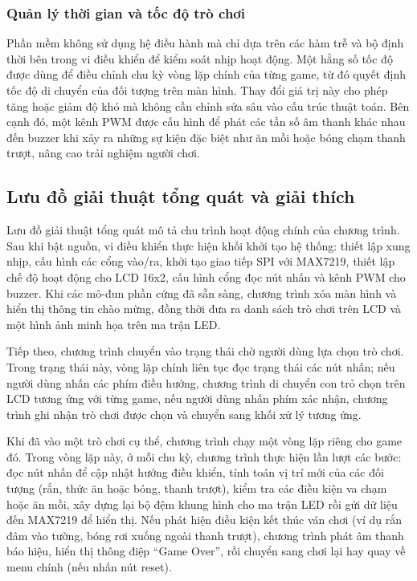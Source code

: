 \subsubsection{Quản lý thời gian và tốc độ trò chơi}
Phần mềm không sử dụng hệ điều hành mà chỉ dựa trên các hàm trễ và bộ định thời bên trong vi điều khiển để kiểm soát nhịp hoạt động. Một hằng số tốc độ được dùng để điều chỉnh chu kỳ vòng lặp chính của từng game, từ đó quyết định tốc độ di chuyển của đối tượng trên màn hình. Thay đổi giá trị này cho phép tăng hoặc giảm độ khó mà không cần chỉnh sửa sâu vào cấu trúc thuật toán. Bên cạnh đó, một kênh PWM được cấu hình để phát các tần số âm thanh khác nhau đến buzzer khi xảy ra những sự kiện đặc biệt như ăn mồi hoặc bóng chạm thanh trượt, nâng cao trải nghiệm người chơi.
\subsection{Lưu đồ giải thuật tổng quát và giải thích}
Lưu đồ giải thuật tổng quát mô tả chu trình hoạt động chính của chương trình. Sau khi bật nguồn, vi điều khiển thực hiện khối khởi tạo hệ thống: thiết lập xung nhịp, cấu hình các cổng vào/ra, khởi tạo giao tiếp SPI với MAX7219, thiết lập chế độ hoạt động cho LCD 16x2, cấu hình cổng đọc nút nhấn và kênh PWM cho buzzer. Khi các mô-đun phần cứng đã sẵn sàng, chương trình xóa màn hình và hiển thị thông tin chào mừng, đồng thời đưa ra danh sách trò chơi trên LCD và một hình ảnh minh họa trên ma trận LED.

Tiếp theo, chương trình chuyển vào trạng thái chờ người dùng lựa chọn trò chơi. Trong trạng thái này, vòng lặp chính liên tục đọc trạng thái các nút nhấn; nếu người dùng nhấn các phím điều hướng, chương trình di chuyển con trỏ chọn trên LCD tương ứng với từng game, nếu người dùng nhấn phím xác nhận, chương trình ghi nhận trò chơi được chọn và chuyển sang khối xử lý tương ứng.

Khi đã vào một trò chơi cụ thể, chương trình chạy một vòng lặp riêng cho game đó. Trong vòng lặp này, ở mỗi chu kỳ, chương trình thực hiện lần lượt các bước: đọc nút nhấn để cập nhật hướng điều khiển, tính toán vị trí mới của các đối tượng (rắn, thức ăn hoặc bóng, thanh trượt), kiểm tra các điều kiện va chạm hoặc ăn mồi, xây dựng lại bộ đệm khung hình cho ma trận LED rồi gửi dữ liệu đến MAX7219 để hiển thị. Nếu phát hiện điều kiện kết thúc ván chơi (ví dụ rắn đâm vào tường, bóng rơi xuống ngoài thanh trượt), chương trình phát âm thanh báo hiệu, hiển thị thông điệp “Game Over”, rồi chuyển sang chơi lại hay quay về menu chính (nếu nhấn nút reset).

